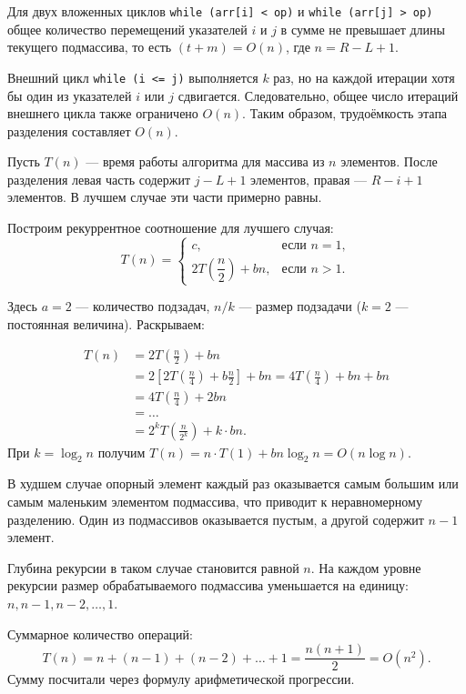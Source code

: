 \documentclass[otchet]{SCWorks}
\begin{document}
Для двух вложенных циклов \texttt{while (arr[i] < op)} и \texttt{while (arr[j] > op)} общее количество перемещений указателей $i$ и $j$ в сумме не превышает длины текущего подмассива, то есть $(t + m) = O(n)$, где $n = R - L + 1$.

Внешний цикл \texttt{while (i <= j)} выполняется $k$ раз, но на каждой итерации хотя бы один из указателей $i$ или $j$ сдвигается. Следовательно, общее число итераций внешнего цикла также ограничено $O(n)$. Таким образом, трудоёмкость этапа разделения составляет $O(n)$.

Пусть $T(n)$ --- время работы алгоритма для массива из $n$ элементов. После разделения левая часть содержит $j - L + 1$ элементов, правая — $R - i + 1$ элементов. В лучшем случае эти части примерно равны.

Построим рекуррентное соотношение для лучшего случая:
\[
T(n) = 
\begin{cases} 
c, & \text{если } n = 1, \\
2T\left(\dfrac{n}{2}\right) + bn, & \text{если } n > 1.
\end{cases}
\]

Здесь $a = 2$ --- количество подзадач, $n/k$ --- размер подзадачи ($k = 2$ — постоянная величина). Раскрываем:

\[
\begin{aligned}
T(n) &= 2T\left(\frac{n}{2}\right) + bn \\
     &= 2\left[2T\left(\frac{n}{4}\right) + b\frac{n}{2}\right] + bn = 4T\left(\frac{n}{4}\right) + bn + bn \\
     &= 4T\left(\frac{n}{4}\right) + 2bn \\
     &= \dots \\
     &= 2^k T\left(\frac{n}{2^k}\right) + k \cdot bn.
\end{aligned}
\]
При $k = \log_2 n$ получим $T(n) = n \cdot T(1) + bn \log_2 n = O(n \log n)$.

В худшем случае опорный элемент каждый раз оказывается самым большим или самым маленьким элементом подмассива, что приводит к неравномерному разделению. Один из подмассивов оказывается пустым, а другой содержит $n-1$ элемент.

Глубина рекурсии в таком случае становится равной $n$. На каждом уровне рекурсии размер обрабатываемого подмассива уменьшается на единицу: $n, n-1, n-2, \dots, 1$.

Суммарное количество операций:
\[
T(n) = n + (n-1) + (n-2) + \dots + 1 = \frac{n(n+1)}{2} = O(n^2).
\]
Сумму посчитали через формулу арифметической прогрессии.
\end{document}
